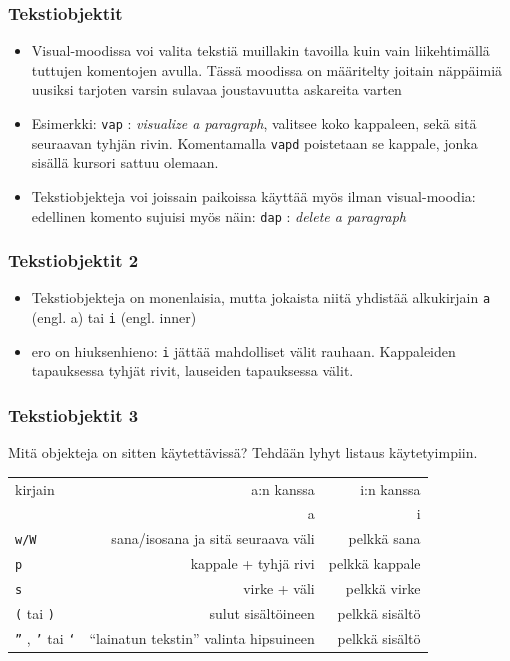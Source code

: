 \documentclass[]{beamer}
\newcommand{\Tohj}[1]{\texttt{#1}}
\newcommand{\com}[1]{{\color{blue!50!black}\Tohj{#1}} \!\!}
\begin{document}

\begin{frame}
    \frametitle{Tekstiobjektit}
    \begin{itemize}
        \item Visual-moodissa voi valita tekstiä muillakin tavoilla kuin vain liikehtimällä tuttujen komentojen avulla. Tässä moodissa on määritelty joitain näppäimiä uusiksi tarjoten varsin sulavaa joustavuutta askareita varten
        \pause
        \item Esimerkki: \com{vap}: \emph{visualize a paragraph}, valitsee koko kappaleen, sekä sitä seuraavan tyhjän rivin. Komentamalla \com{vapd} poistetaan se kappale, jonka sisällä kursori sattuu olemaan.
        \pause
        \item Tekstiobjekteja voi joissain paikoissa käyttää myös ilman visual-moodia: edellinen komento sujuisi myös näin: \com{dap}: \emph{delete a paragraph}
    \end{itemize}
\end{frame}

\begin{frame}
    \frametitle{Tekstiobjektit 2}
    \begin{itemize}
        \item Tekstiobjekteja on monenlaisia, mutta jokaista niitä yhdistää alkukirjain \com{a} (engl. a) tai \com{i} (engl. inner)
        \item ero on hiuksenhieno: \com{i} jättää mahdolliset välit rauhaan. Kappaleiden tapauksessa tyhjät rivit, lauseiden tapauksessa välit.
    \end{itemize}
\end{frame}

\begin{frame}
    \frametitle{Tekstiobjektit 3}
    Mitä objekteja on sitten käytettävissä? Tehdään lyhyt listaus käytetyimpiin. \\
    \vspace{0.4cm}
    \begin{tabular}{lrr}
    \hline
    kirjain & a:n kanssa & i:n kanssa \\
    {\color{red}{$x$}} & a{{\color{red}{$x$}} } & i{\color{red}{$x$}} \\
    \hline \hline
    \com{w/W} & sana/isosana ja sitä seuraava väli & pelkkä sana\\
    \com{p} & kappale + tyhjä rivi & pelkkä kappale\\
    \com{s} & virke + väli & pelkkä virke \\
    \com{(} tai \com{)} & sulut sisältöineen & pelkkä sisältö \\
    \com{''}, \com{'} tai \com{`} & ``lainatun tekstin'' valinta hipsuineen & pelkkä sisältö\\
    \end{tabular}
\end{frame}
\end{document}
